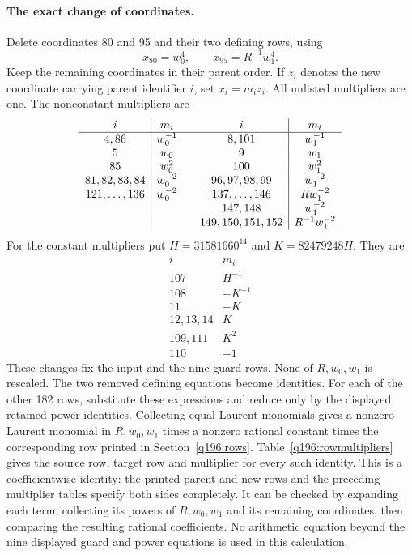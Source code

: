 \paragraph{The exact change of coordinates.}
Delete coordinates 80 and 95 and their two defining rows, using
\[
 x_{80}=w_0^4,\qquad x_{95}=R^{-1}w_1^4.
\]
Keep the remaining coordinates in their parent order. If $z_i$ denotes
the new coordinate carrying parent identifier $i$, set $x_i=m_i z_i$.
All unlisted multipliers are one. The nonconstant multipliers are
\[
\begin{array}{c|c@{\qquad}c|c}
 i&m_i&i&m_i\\\hline
 4,86&w_0^{-1}&8,101&w_1^{-1}\\
 5&w_0&9&w_1\\
 85&w_0^2&100&w_1^2\\
 81,82,83,84&w_0^{-2}&96,97,98,99&w_1^{-2}\\
 121,\ldots,136&w_0^{-2}&137,\ldots,146&Rw_1^{-2}\\
 &&147,148&w_1^{-2}\\
 &&149,150,151,152&R^{-1}w_1^{-2}
\end{array}
\]
For the constant multipliers put $H=31581660^{14}$ and $K=82479248H$.
They are
\[
\begin{array}{c|c}
 i&m_i\\\hline
 107&H^{-1}\\
 108&-K^{-1}\\
 11&-K\\
 12,13,14&K\\
 109,111&K^2\\
 110&-1
\end{array}
\]
These changes fix the input and the nine guard rows. None of $R,w_0,w_1$
is rescaled. The two removed defining equations become identities.
For each of the other 182 rows, substitute these expressions and reduce
only by the displayed retained power identities. Collecting equal
Laurent monomials gives a nonzero Laurent monomial in $R,w_0,w_1$
times a nonzero rational constant times the corresponding row printed
in Section~\ref{q196:rows}. Table~\ref{q196:rowmultipliers} gives the
source row, target row and multiplier for every such identity.
This is a coefficientwise identity: the
printed parent and new rows and the preceding multiplier tables specify
both sides completely. It can be checked by expanding each term,
collecting its powers of $R,w_0,w_1$ and its remaining coordinates,
then comparing the resulting rational coefficients. No arithmetic
equation beyond the nine displayed guard and power equations is used
in this calculation.

